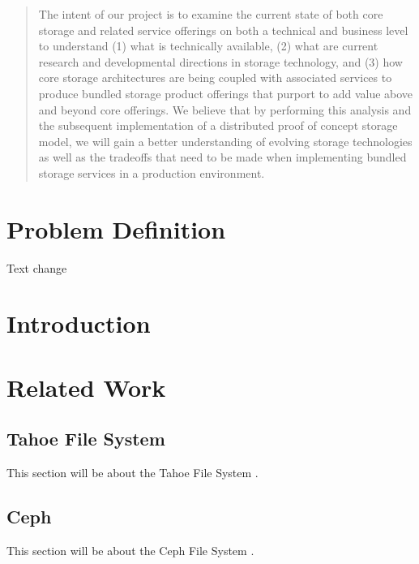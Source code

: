 \documentclass[11pt]{article}
\begin{document}
\begin{abstract}
The intent of our project is to examine the current state of both core storage and related service offerings on both a 
technical and business level to understand (1) what is technically available, (2) what are current research and 
developmental directions in storage technology, and (3) how core storage architectures are being coupled with associated
services to produce bundled storage product offerings that purport to add value above and beyond core offerings. We 
believe that by performing this analysis and the subsequent implementation of a distributed proof of concept storage 
model, we will gain a better understanding of evolving storage technologies as well as the tradeoffs that need to be 
made when implementing bundled storage services in a production environment.

\end{abstract}

\newpage

\section{Problem Definition}
Text change

\section{Introduction}


\section{Related Work}
\subsection{Tahoe File System}
This section will be about the Tahoe File System
\cite{WilcoxOHearn:2008p1275}.

\subsection{Ceph}
This section will be about the Ceph File System
\cite{Weil:2012p1035,Weil:2012p1010,Weil:2006p1273}.

\nocite{*}

\end{document}
